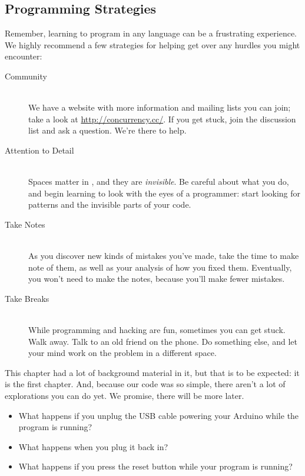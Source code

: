 \subsection{Programming Strategies}
Remember, learning to program in any language can be a frustrating experience. We highly recommend a few strategies for helping get over any hurdles you might encounter:

\begin{description}
	\item[Community]\ \\ We have a website with more information and mailing lists you can join; take a look at \url{http://concurrency.cc/}. If you get stuck, join the discussion list and ask a question. We're there to help.
	\item[Attention to Detail]\ \\ Spaces matter in \plumbing, and they are {\em invisible}. Be careful about what you do, and begin learning to look with the eyes of a programmer: start looking for patterns and the invisible parts of your code.
	\item[Take Notes]\ \\ As you discover new kinds of mistakes you've made, take the time to make note of them, as well as your analysis of how you fixed them. Eventually, you won't need to make the notes, because you'll make fewer mistakes.
	\item[Take Breaks]\ \\ While programming and hacking are fun, sometimes you can get stuck. Walk away. Talk to an old friend on the phone. Do something else, and let your mind work on the problem in a different space.
\end{description}

\EXPLORATIONS
This chapter had a lot of background material in it, but that is to be expected: it is the first chapter. And, because our code was so simple, there aren't a lot of explorations you can do yet. We promise, there will be more later.

\begin{itemize}
	\item What happens if you unplug the USB cable powering your Arduino while the program is running? 
	\item What happens when you plug it back in?
	\item What happens if you press the reset button while your program is running?
\end{itemize}
